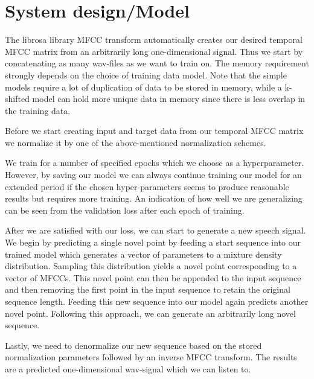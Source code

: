 \documentclass[conference]{IEEEtran}
\begin{document}
\section{System design/Model}
The librosa library MFCC transform automatically creates our desired temporal MFCC matrix from an arbitrarily long one-dimensional signal. Thus we start by concatenating as many wav-files as we want to train on. The memory requirement strongly depends on the choice of training data model. Note that the simple models require a lot of duplication of data to be stored in memory, while a k-shifted model can hold more unique data in memory since there is less overlap in the training data. 

Before we start creating input and target data from our temporal MFCC matrix we normalize it by one of the above-mentioned normalization schemes.

We train for a number of specified epochs which we choose as a hyperparameter. However, by saving our model we can always continue training our model for an extended period if the chosen hyper-parameters seems to produce reasonable results but requires more training. An indication of how well we are generalizing can be seen from the validation loss after each epoch of training.

After we are satisfied with our loss, we can start to generate a new speech signal. We begin by predicting a single novel point by feeding a start sequence into our trained model which generates a vector of parameters to a mixture density distribution. Sampling this distribution yields a novel point corresponding to a vector of MFCCs. This novel point can then be appended to the input sequence and then removing the first point in the input sequence to retain the original sequence length. Feeding this new sequence into our model again predicts another novel point. Following this approach, we can generate an arbitrarily long novel sequence. 

Lastly, we need to denormalize our new sequence based on the stored normalization parameters followed by an inverse MFCC transform. The results are a predicted one-dimensional wav-signal which we can listen to.
\end{document}
